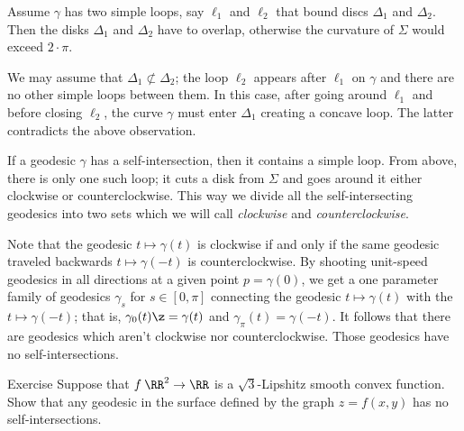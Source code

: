 Assume $\gamma$ has two simple loops, say $\ell_1$ and $\ell_2$ that bound discs $\Delta_1$ and $\Delta_2$.
Then the disks $\Delta_1$ and $\Delta_2$ have to overlap,
otherwise the curvature of $\Sigma$ would exceed $2\cdot\pi$.

We may assume that $\Delta_1\not\subset \Delta_2$; the loop $\ell_2$ appears after $\ell_1$ on $\gamma$ and there are no other simple loops between them.
In this case, after going around $\ell_1$ and before closing $\ell_2$, the curve $\gamma$ must enter $\Delta_1$ creating a concave loop.
The latter contradicts the above observation.

If a geodesic $\gamma$ has a self-intersection,
then it contains a simple loop.
From above, there is only one such loop;
it cuts a disk from $\Sigma$ 
and goes around it either clockwise or counterclockwise.
This way we divide all the self-intersecting geodesics 
into two sets which we will call {}\emph{clockwise} and {}\emph{counterclockwise}.

Note that the geodesic $t\mapsto \gamma(t)$ is clockwise 
if and only if the same geodesic traveled backwards
$t\mapsto \gamma(-t)$
is counterclockwise.
By shooting unit-speed geodesics in all directions at a given point $p=\gamma(0)$,
we get a one parameter family of geodesics $\gamma_s$ for $s\in[0,\pi]$ connecting the geodesic $t\mapsto \gamma(t)$ with
the $t\mapsto \gamma(-t)$; that is, $\gamma_0(t)\z=\gamma(t)$ and $\gamma_\pi(t)=\gamma(-t)$. 
It follows that there are geodesics 
which aren't clockwise nor counterclockwise.
Those geodesics have no self-intersections.\qeds

\begin{thm}{Exercise}
Suppose that $f\:\RR^2\to\RR$ is a $\sqrt{3}$-Lipshitz smooth convex function.
Show that any geodesic in the surface defined by the graph $z=f(x,y)$ has no self-intersections.
\end{thm}








































